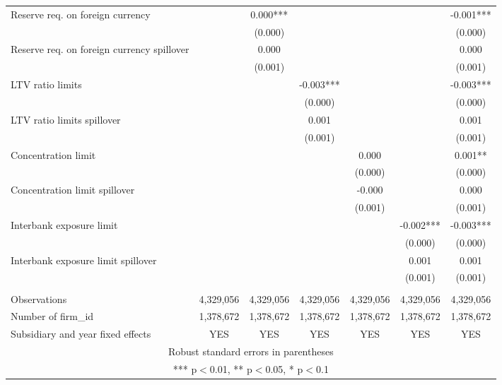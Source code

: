 \begin{tabular}{lcccccc}
Reserve req. on foreign currency &  & 0.000*** &  &  &  & -0.001*** \\
 &  & (0.000) &  &  &  & (0.000) \\
Reserve req. on foreign currency spillover &  & 0.000 &  &  &  & 0.000 \\
 &  & (0.001) &  &  &  & (0.001) \\
LTV ratio limits &  &  & -0.003*** &  &  & -0.003*** \\
 &  &  & (0.000) &  &  & (0.000) \\
LTV ratio limits spillover &  &  & 0.001 &  &  & 0.001 \\
 &  &  & (0.001) &  &  & (0.001) \\
Concentration limit &  &  &  & 0.000 &  & 0.001** \\
 &  &  &  & (0.000) &  & (0.000) \\
Concentration limit spillover &  &  &  & -0.000 &  & 0.000 \\
 &  &  &  & (0.001) &  & (0.001) \\
Interbank exposure limit &  &  &  &  & -0.002*** & -0.003*** \\
 &  &  &  &  & (0.000) & (0.000) \\
Interbank exposure limit spillover &  &  &  &  & 0.001 & 0.001 \\
 &  &  &  &  & (0.001) & (0.001) \\
 &  &  &  &  &  &  \\
Observations & 4,329,056 & 4,329,056 & 4,329,056 & 4,329,056 & 4,329,056 & 4,329,056 \\
Number of firm\_id & 1,378,672 & 1,378,672 & 1,378,672 & 1,378,672 & 1,378,672 & 1,378,672 \\
 Subsidiary and year fixed effects & YES & YES & YES & YES & YES & YES \\ \hline
\multicolumn{7}{c}{ Robust standard errors in parentheses} \\
\multicolumn{7}{c}{ *** p$<$0.01, ** p$<$0.05, * p$<$0.1} \\
\end{tabular}

